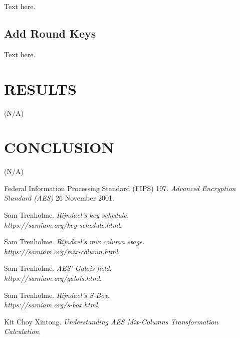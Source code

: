 \documentclass[a4paper, 10pt]{article}
\begin{document}
\begin{multicols}{2}
            Text here.

            \subsection{Add Round Keys}

            Text here.

        \section{RESULTS}

        (N/A)

        \section{CONCLUSION}

        (N/A)

        \begin{thebibliography}{3}
            Federal Information Processing Standard (FIPS) 197.
            \textit{Advanced Encryption Standard (AES)}
            26 November 2001.

            Sam Trenholme.
            \textit{Rijndael's key schedule.\\https://samiam.org/key-schedule.html}.

            Sam Trenholme.
            \textit{Rijndael's mix column stage.\\https://samiam.org/mix-column.html}.

            Sam Trenholme.
            \textit{AES' Galois field.\\https://samiam.org/galois.html}.

            Sam Trenholme.
            \textit{Rijndael's S-Box.\\https://samiam.org/s-box.html}.

            Kit Choy Xintong.
            \textit{Understanding AES Mix-Columns Transformation Calculation}.
        \end{thebibliography}

    \end{multicols}
\end{document}
